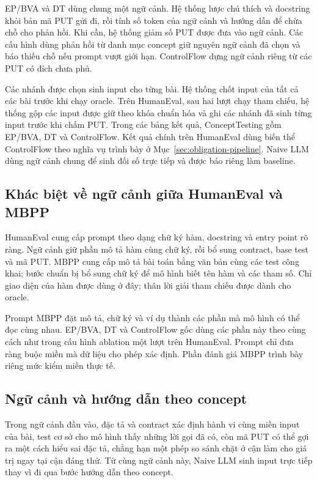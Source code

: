 EP/BVA và DT dùng chung một ngữ cảnh. Hệ thống lược chú thích và docstring khỏi bản mã PUT gửi đi, rồi tính số token của ngữ cảnh và hướng dẫn để chừa chỗ cho phản hồi. Khi cần, hệ thống giảm số PUT được đưa vào ngữ cảnh. Các cấu hình dùng phản hồi từ danh mục concept giữ nguyên ngữ cảnh đã chọn và báo thiếu chỗ nếu prompt vượt giới hạn. ControlFlow dựng ngữ cảnh riêng từ các PUT có đích chưa phủ.

Các nhánh được chọn sinh input cho từng bài. Hệ thống chốt input của tất cả các bài trước khi chạy oracle. Trên HumanEval, sau hai lượt chạy tham chiếu, hệ thống gộp các input được giữ theo khóa chuẩn hóa và ghi các nhánh đã sinh từng input trước khi chấm PUT. Trong các bảng kết quả, ConceptTesting gồm EP/BVA, DT và ControlFlow. Kết quả chính trên HumanEval dùng biến thể ControlFlow theo nghĩa vụ trình bày ở Mục~\ref{sec:obligation-pipeline}. Naive LLM dùng ngữ cảnh chung để sinh đối số trực tiếp và được báo riêng làm baseline.

\subsection{Khác biệt về ngữ cảnh giữa HumanEval và MBPP}

HumanEval cung cấp prompt theo dạng chữ ký hàm, docstring và entry point rõ ràng. Ngữ cảnh giữ phần mô tả hàm cùng chữ ký, rồi bổ sung contract, base test và mã PUT. MBPP cung cấp mô tả bài toán bằng văn bản cùng các test công khai; bước chuẩn bị bổ sung chữ ký để mô hình biết tên hàm và các tham số. Chỉ giao diện của hàm được dùng ở đây; thân lời giải tham chiếu được dành cho oracle.

Prompt MBPP đặt mô tả, chữ ký và ví dụ thành các phần mà mô hình có thể đọc cùng nhau. EP/BVA, DT và ControlFlow gốc dùng các phần này theo cùng cách như trong cấu hình ablation một lượt trên HumanEval. Prompt chỉ đưa ràng buộc miền mà dữ liệu cho phép xác định. Phần đánh giá MBPP trình bày riêng mức kiểm miền thực tế.

\subsection{Ngữ cảnh và hướng dẫn theo concept}
\label{sec:concept-guidance}

Trong ngữ cảnh đầu vào, đặc tả và contract xác định hành vi cùng miền input của bài, test cơ sở cho mô hình thấy những lời gọi đã có, còn mã PUT có thể gợi ra một cách hiểu sai đặc tả, chẳng hạn một phép so sánh chặt ở cận làm cho giá trị ngay tại cận đáng thử. Từ cùng ngữ cảnh này, Naive LLM sinh input trực tiếp thay vì đi qua bước hướng dẫn theo concept.

